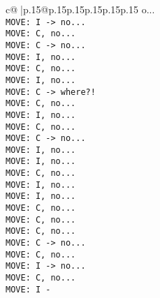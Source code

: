 \documentclass{article}
\begin{document}
{\begin{supertabular}{c@{$\;$}|p{.15\linewidth}@{}p{.15\linewidth}p{.15\linewidth}p{.15\linewidth}p{.15\linewidth}p{.15\linewidth}}
{{{o...\\ \tt  MOVE: I -> no...\\ \tt  MOVE: C, no...\\ \tt  MOVE: C -> no...\\ \tt  MOVE: I, no...\\ \tt  MOVE: C, no...\\ \tt  MOVE: I, no...\\ \tt  MOVE: C -> where?!\\ \tt  MOVE: C, no...\\ \tt  MOVE: I, no...\\ \tt  MOVE: C, no...\\ \tt  MOVE: C -> no...\\ \tt  MOVE: I, no...\\ \tt  MOVE: I, no...\\ \tt  MOVE: C, no...\\ \tt  MOVE: I, no...\\ \tt  MOVE: I, no...\\ \tt  MOVE: C, no...\\ \tt  MOVE: C, no...\\ \tt  MOVE: C, no...\\ \tt  MOVE: C -> no...\\ \tt  MOVE: C, no...\\ \tt  MOVE: I -> no...\\ \tt  MOVE: C, no...\\ \tt  MOVE: I -}}}
\end{supertabular}}
\end{document}
